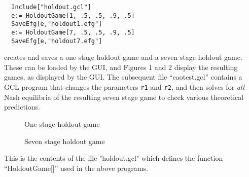 \begin{verbatim}
  Include["holdout.gcl"]
  e:= HoldoutGame[1, .5, .5, .9, .5]
  SaveEfg[e,"holdout1.efg"]
  e:= HoldoutGame[7, .5, .5, .9, .5]
  SaveEfg[e,"holdout7.efg"]
\end{verbatim}

\noindent
creates and saves a one stage holdout game and a seven stage holdout
game. These can be loaded by the GUI, and Figures 1 and 2 display the
resulting games, as displayed by the GUI.  The subsequent file
``eaotest.gcl'' contains a GCL program that changes the parameters
\verb+r1+ and \verb+r2+, and then solves for {\em all} Nash equilibria
of the resulting seven stage game to check various theoretical predictions.

\begin{figure}[htp]
\caption{One stage holdout game}
\end{figure}
\begin{figure}[htp]
\caption{Seven stage holdout game}
\end{figure}

\newpage
\noindent
This is the contents of the file "holdout.gcl" which defines the
function ``HoldoutGame[]'' used in the above programs.

